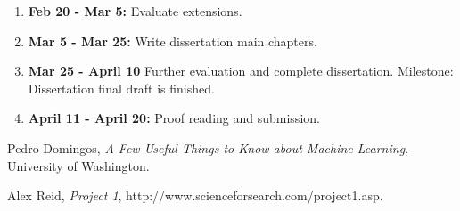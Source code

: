 \begin{enumerate}
\item {\bf Feb 20 - Mar 5:} Evaluate extensions. 

\item {\bf Mar 5 - Mar 25:} Write dissertation main chapters.

\item {\bf Mar 25 - April 10}  Further evaluation and complete dissertation.
{Milestone: } Dissertation final draft is finished.

\item {\bf April 11 - April 20:} Proof reading and submission.

\end{enumerate}

\begin{thebibliography}{9}

  Pedro Domingos,
  \emph{A Few Useful Things to Know about Machine Learning},
  University of Washington.
  
  Alex Reid,
  \emph{Project 1},
  http://www.scienceforsearch.com/project1.asp. 

\end{thebibliography}

 

